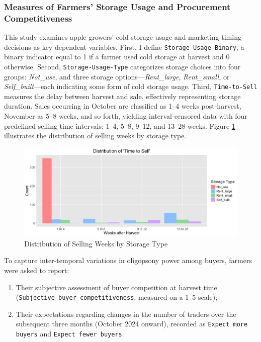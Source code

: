\documentclass[12pt]{article}
\begin{document}
\subsubsection{Measures of Farmers' Storage Usage and Procurement Competitiveness}
\noindent This study examines apple growers' cold storage usage and marketing timing decisions as key dependent variables. First, I define \texttt{Storage-Usage-Binary}, a binary indicator equal to 1 if a farmer used cold storage at harvest and 0 otherwise. Second, \texttt{Storage-Usage-Type} categorizes storage choices into four groups: \textit{Not\_use}, and three storage options—\textit{Rent\_large}, \textit{Rent\_small}, or \textit{Self\_built}—each indicating some form of cold storage usage. Third, \texttt{Time-to-Sell} measures the delay between harvest and sale, effectively representing storage duration. Sales occurring in October are classified as 1–4 weeks post-harvest, November as 5–8 weeks, and so forth, yielding interval-censored data with four predefined selling-time intervals: 1–4, 5–8, 9–12, and 13–28 weeks. Figure \ref{Figure: selling weeks distribution} illustrates the distribution of selling weeks by storage type.

\begin{figure}[H]
\centering
\includegraphics[width=1\textwidth]{figures/selling_weeks_distribution.png}
\caption{Distribution of Selling Weeks by Storage Type}
\label{Figure: selling weeks distribution}
\end{figure}

To capture inter-temporal variations in oligopsony power among buyers, farmers were asked to report:
\begin{enumerate}
    \item Their subjective assessment of buyer competition at harvest time (\texttt{Subjective buyer competitiveness}, measured on a 1–5 scale);
    \item Their expectations regarding changes in the number of traders over the subsequent three months (October 2024 onward), recorded as \texttt{Expect more buyers} and \texttt{Expect fewer buyers}.
\end{enumerate}
\end{document}
